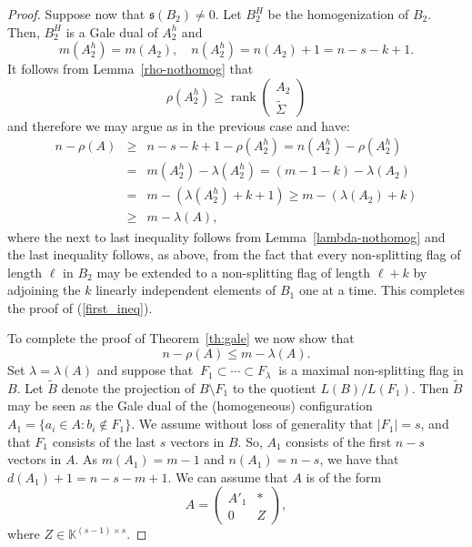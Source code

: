 \documentclass[11pt]{amsart}
\theoremstyle{plain}
\theoremstyle{definition}
\theoremstyle{remark}
\newcommand{\rank}{\operatorname{rank}}
\newcommand{\beas}{\begin{eqnarray*}}
\newcommand{\eeas}{\end{eqnarray*}}
\renewcommand{\k}{{\mathbb K}}
\newcommand{\fs}{\mathfrak s}
\numberwithin{equation}{section}
\begin{document}
\begin{proof}
\medskip

Suppose now that $\fs(B_2) \not= 0$.  Let $ B_2^H$ be the homogenization of $B_2$.  Then,  $B_2^H$ is a Gale dual of
$A_{2}^h$ and 
$$m(A_{2}^h)= m(A_2), \quad n(A_{2}^h)= n(A_2)+1= n-s-k+1.$$
It follows from Lemma~\ref{rho-nothomog} that 
$$\rho(A_2^h) \geq \rank \left(\begin{array}{c}A_{2} \\ \tilde\Sigma \end{array}\right)$$ 
and therefore we may argue as in the previous case and have:
\beas
n - \rho(A) & \geq & n - s  - k + 1 - \rho(A^h_2)
= n(A^h_2) - \rho(A^h_2) \\
&=& m(A^h_2) - \lambda(A^h_2) 
= (m-1-k) - \lambda(A_2) \\
&=& m - (\lambda(A^h_2) + k + 1)
\geq  m- (\lambda(A_2)+k)\\
&\geq & m-\lambda(A),
\eeas
where the next to last inequality follows from Lemma~\ref{lambda-nothomog} and the last inequality follows, as above,  from the fact
that every non-splitting flag of length $\ell$ in $B_2$ may be extended to a non-splitting flag of
length $\ell + k$ by adjoining the $k$ linearly independent elements of $B_1$ one at a time.
 This completes the proof of (\ref{first_ineq}).

\bigskip

To complete the proof of Theorem~\ref{th:gale} we now show that 
\begin{equation}\label{second_ineq} n-\rho(A) \leq m - \lambda(A).
\end{equation}
  Set $\lambda = \lambda(A)$ and suppose that 
$\ F_1 \subset \cdots \subset F_\lambda\ $
is a maximal non-splitting flag in $B$.  Let $\tilde B$ denote the projection of $B \setminus F_1$ to the quotient 
$L(B)/ L(F_1)$.  Then $\tilde B$ may be seen as the Gale dual of the (homogeneous) configuration $A_1 = \{a_i \in A : b_i \not \in F_1\}$.
We assume without loss of generality that $|F_1| = s$,
 and that $F_1$ consists of the last $s$ vectors in $B$. So,  
$A_1$ consists of the first $n-s$ vectors in $A$. As $m(A_1)=m-1$ and $n(A_1)=n-s$,  we have that $d(A_1)+1=n-s-m+1$. 
We can assume that $A$ is of the form
$$A = \left(\begin{array}{cc}A'_1 & \ast \\0 & Z\end{array}\right),$$
where $Z \in \k^{(s-1) \times s}$.


\end{proof}
\end{document}
